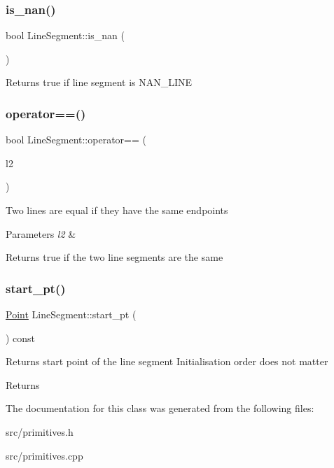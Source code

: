 \subsubsection{\texorpdfstring{is\+\_\+nan()}{is\_nan()}}
{\footnotesize\ttfamily bool Line\+Segment\+::is\+\_\+nan (\begin{DoxyParamCaption}{ }\end{DoxyParamCaption})}

\begin{DoxyReturn}{Returns}
true if line segment is N\+A\+N\+\_\+\+L\+I\+NE 
\end{DoxyReturn}
\mbox{\label{classLineSegment_ae73906b7230adbccf243c4b8dc6482b3}} 
\subsubsection{\texorpdfstring{operator==()}{operator==()}}
{\footnotesize\ttfamily bool Line\+Segment\+::operator== (\begin{DoxyParamCaption}\item[{const \hyperlink{classLineSegment}{Line\+Segment} \&}]{l2 }\end{DoxyParamCaption})}

Two lines are equal if they have the same endpoints 
\begin{DoxyParams}{Parameters}
{\em l2} & \\
\hline
\end{DoxyParams}
\begin{DoxyReturn}{Returns}
true if the two line segments are the same 
\end{DoxyReturn}
\mbox{\label{classLineSegment_abe9136323cfe46be663907cbc1e3da2d}} 
\subsubsection{\texorpdfstring{start\+\_\+pt()}{start\_pt()}}
{\footnotesize\ttfamily \hyperlink{classPoint}{Point} Line\+Segment\+::start\+\_\+pt (\begin{DoxyParamCaption}{ }\end{DoxyParamCaption}) const}

Returns start point of the line segment Initialisation order does not matter \begin{DoxyReturn}{Returns}

\end{DoxyReturn}


The documentation for this class was generated from the following files\+:\begin{DoxyCompactItemize}
\item 
src/primitives.\+h\item 
src/primitives.\+cpp\end{DoxyCompactItemize}
